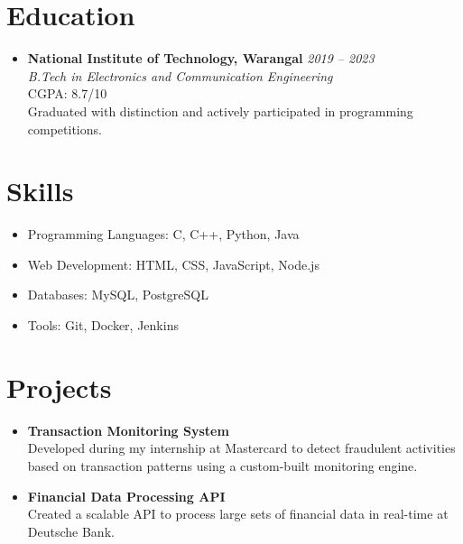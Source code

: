 \documentclass[a4paper,10pt]{article}
\newcommand{\companylogo}[2]{\raisebox{-0.3\height}{\texttt{[image: \#1]}}}
\begin{document}
\vspace{0.5em} %

\section*{Education}
\begin{itemize}[leftmargin=0.3in, itemsep=4pt, topsep=4pt]
    \item
    \textbf{\companylogo{nitw-logo.png}{0.6cm} National Institute of Technology, Warangal} \hfill \textit{2019 – 2023} \\
    \textit{B.Tech in Electronics and Communication Engineering} \\
    CGPA: 8.7/10 \\
    Graduated with distinction and actively participated in programming competitions.
\end{itemize}

\vspace{0.5em} %

\section*{Skills}
\begin{itemize}[leftmargin=0.3in, itemsep=4pt, topsep=4pt]
    \item Programming Languages: C, C++, Python, Java
    \item Web Development: HTML, CSS, JavaScript, Node.js
    \item Databases: MySQL, PostgreSQL
    \item Tools: Git, Docker, Jenkins
\end{itemize}

\vspace{0.5em} %

\section*{Projects}
\begin{itemize}[leftmargin=0.3in, itemsep=4pt, topsep=4pt]
    \item \textbf{Transaction Monitoring System} \\
    Developed during my internship at Mastercard to detect fraudulent activities based on transaction patterns using a custom-built monitoring engine.

    \item \textbf{Financial Data Processing API} \\
    Created a scalable API to process large sets of financial data in real-time at Deutsche Bank.
\end{itemize}
\end{document}

